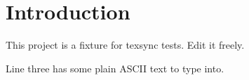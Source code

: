 \section{Introduction}
This project is a fixture for texsync tests. Edit it freely.

Line three has some plain ASCII text to type into.
